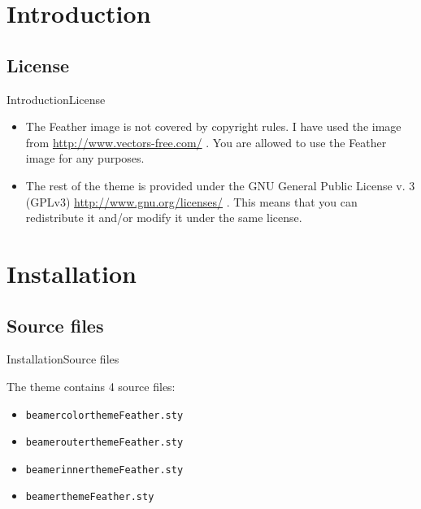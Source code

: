 \documentclass[aspectratio=169]{beamer}
\newcommand{\chref}[2]{
  \href{#1}{\usebeamercolor{fg}{}#2}
}
\begin{document}
\section{Introduction}
\subsection{License}
\begin{frame}{Introduction}{License}

  \begin{itemize}
    \item<1-> The Feather image is not covered by copyright rules. I have used the image from \chref{http://www.vectors-free.com/}{http://www.vectors-free.com/}. You are allowed to use the Feather image for any purposes.
    \item<2-> The rest of the theme is provided under the GNU General Public License v. 3 (GPLv3) \chref{http://www.gnu.org/licenses/}{http://www.gnu.org/licenses/}. This means that you can redistribute it and/or modify it under the same license. 
  \end{itemize}
\end{frame}

\section{Installation}
\subsection{Source files}
\begin{frame}{Installation}{Source files}

\begin{block}{}
The theme contains 4 source files:
  \begin{itemize}
    \item {\tt beamercolorthemeFeather.sty}
    \item {\tt beamerouterthemeFeather.sty}
    \item {\tt beamerinnerthemeFeather.sty}
    \item {\tt beamerthemeFeather.sty}
  \end{itemize}
\end{block}
\end{frame}
\end{document}
